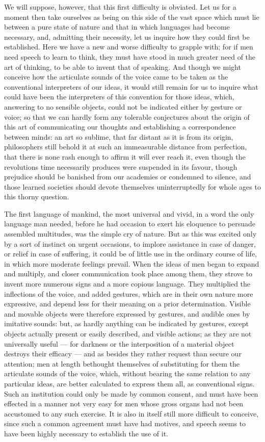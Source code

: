 \documentclass[12pt]{report}
\begin{document}
We will suppose, however, that this first difficulty is obviated. Let us for a moment then take ourselves as being on this side of the vast space which must lie between a pure state of nature and that in which languages had become necessary, and, admitting their necessity, let us inquire how they could first be established. Here we have a new and worse difficulty to grapple with; for if men need speech to learn to think, they must have stood in much greater need of the art of thinking, to be able to invent that of speaking. And though we might conceive how the articulate sounds of the voice came to be taken as the conventional interpreters of our ideas, it would still remain for us to inquire what could have been the interpreters of this convention for those ideas, which, answering to no sensible objects, could not be indicated either by gesture or voice; so that we can hardly form any tolerable conjectures about the origin of this art of communicating our thoughts and establishing a correspondence between minds: an art so sublime, that far distant as it is from its origin, philosophers still behold it at such an immeasurable distance from perfection, that there is none rash enough to affirm it will ever reach it, even though the revolutions time necessarily produces were suspended in its favour, though prejudice should be banished from our academies or condemned to silence, and those learned societies should devote themselves uninterruptedly for whole ages to this thorny question.

The first language of mankind, the most universal and vivid, in a word the only language man needed, before he had occasion to exert his eloquence to persuade assembled multitudes, was the simple cry of nature. But as this was excited only by a sort of instinct on urgent occasions, to implore assistance in case of danger, or relief in case of suffering, it could be of little use in the ordinary course of life, in which more moderate feelings prevail. When the ideas of men began to expand and multiply, and closer communication took place among them, they strove to invent more numerous signs and a more copious language. They multiplied the inflections of the voice, and added gestures, which are in their own nature more expressive, and depend less for their meaning on a prior determination. Visible and movable objects were therefore expressed by gestures, and audible ones by imitative sounds: but, as hardly anything can be indicated by gestures, except objects actually present or easily described, and visible actions; as they are not universally useful — for darkness or the interposition of a material object destroys their efficacy — and as besides they rather request than secure our attention; men at length bethought themselves of substituting for them the articulate sounds of the voice, which, without bearing the same relation to any particular ideas, are better calculated to express them all, as conventional signs. Such an institution could only be made by common consent, and must have been effected in a manner not very easy for men whose gross organs had not been accustomed to any such exercise. It is also in itself still more difficult to conceive, since such a common agreement must have had motives, and speech seems to have been highly necessary to establish the use of it.
\end{document}
